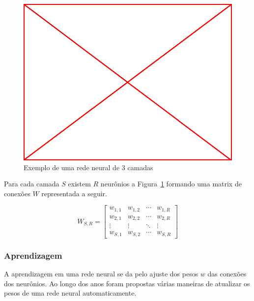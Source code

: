 \begin{figure}
\label{fig:003-nn}
  \caption{Exemplo de uma rede neural de 3 camadas}
  \begin{center}
    \includegraphics[scale=0.5]{placeholder}
  \end{center}
\end{figure}

Para cada camada $S$ existem $R$ neurônios a Figura~\ref{fig:003-nn} formando
uma matrix de conexões $W$ representada a seguir.

$$ W_{S,R} =
\begin{bmatrix}
  w_{1,1} & w_{1,2} & \cdots & w_{1,R} \\
  w_{2,1} & w_{2,2} & \cdots & w_{2,R} \\
  \vdots  & \vdots  & \ddots & \vdots  \\
  w_{S,1} & w_{S,2} & \cdots & w_{S,R} 
\end{bmatrix}
$$

\subsubsection{Aprendizagem}

A aprendizagem em uma rede neural se da pelo ajuste dos pesos $w$ das conexões
dos neurônios. Ao longo dos anos foram propostas várias maneiras de atualizar
os pesos de uma rede neural automaticamente.

